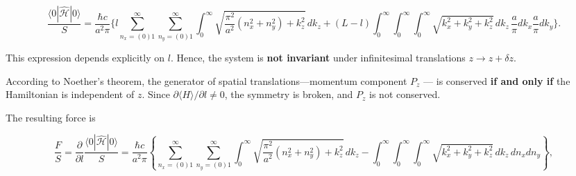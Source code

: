 \documentclass[twoside, 10pt]{article}
\begin{document}
\[
\frac{\langle 0|\hat{\mathcal{H}}|0\rangle}{S} = \frac{\hbar c}{a^2\pi} \Bigg\{
l \sum_{n_x=(0)1}^{\infty}\sum_{n_y=(0)1}^{\infty}
\int_0^{\infty} \sqrt{ \frac{\pi^2}{a^2}(n_x^2 + n_y^2) + k_z^2 } \, dk_z
+ (L - l) \int_0^{\infty}\!\!\int_0^{\infty}
\int_0^{\infty} \sqrt{k_x^2 + k_y^2 + k_z^2} \, dk_z \, \frac{a}{\pi}dk_x \frac{a}{\pi}dk_y
\Bigg\}.
\]

\begin{multicols}{2}

This expression depends explicitly on \(l\). Hence, the system is \textbf{not invariant} under infinitesimal translations \(z \to z + \delta z\).

According to Noether’s theorem, the generator of spatial translations—momentum component \(P_z\) — is conserved
\textbf{if and only if} the Hamiltonian is independent of \(z\).
Since \(\partial \langle H \rangle / \partial l \neq 0\), the symmetry is broken,
and \(P_z\) is not conserved.

The resulting force is
\end{multicols}

\[
\frac{F}{S} = \frac{\partial}{\partial l} \frac{\langle 0|\hat{\mathcal{H}}|0\rangle}{S}
= \frac{\hbar c}{a^2\pi} \left\{
\sum_{n_x=(0)1}^{\infty}\sum_{n_y=(0)1}^{\infty}
\int_0^{\infty} \sqrt{ \frac{\pi^2}{a^2}(n_x^2 + n_y^2) + k_z^2 } \, dk_z
- \int_0^{\infty}\!\!\int_0^{\infty}
\int_0^{\infty} \sqrt{k_x^2 + k_y^2 + k_z^2} \, dk_z \, dn_x dn_y
\right\},
\]
\end{document}
